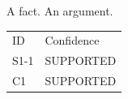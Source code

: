 A fact.
An argument.
\begin{tabular}{ll}
ID & Confidence \\
S1-1 & SUPPORTED \\
C1 & SUPPORTED \\
\end{tabular}
